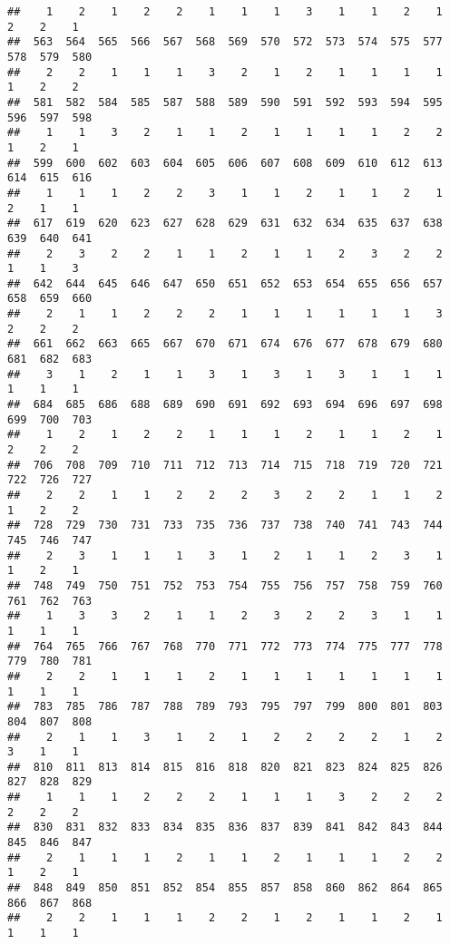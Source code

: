 \documentclass[
]{article}
\begin{document}
\begin{verbatim}
##    1    2    1    2    2    1    1    1    3    1    1    2    1    2    2    1 
##  563  564  565  566  567  568  569  570  572  573  574  575  577  578  579  580 
##    2    2    1    1    1    3    2    1    2    1    1    1    1    1    2    2 
##  581  582  584  585  587  588  589  590  591  592  593  594  595  596  597  598 
##    1    1    3    2    1    1    2    1    1    1    1    2    2    1    2    1 
##  599  600  602  603  604  605  606  607  608  609  610  612  613  614  615  616 
##    1    1    1    2    2    3    1    1    2    1    1    2    1    2    1    1 
##  617  619  620  623  627  628  629  631  632  634  635  637  638  639  640  641 
##    2    3    2    2    1    1    2    1    1    2    3    2    2    1    1    3 
##  642  644  645  646  647  650  651  652  653  654  655  656  657  658  659  660 
##    2    1    1    2    2    2    1    1    1    1    1    1    3    2    2    2 
##  661  662  663  665  667  670  671  674  676  677  678  679  680  681  682  683 
##    3    1    2    1    1    3    1    3    1    3    1    1    1    1    1    1 
##  684  685  686  688  689  690  691  692  693  694  696  697  698  699  700  703 
##    1    2    1    2    2    1    1    1    2    1    1    2    1    2    2    2 
##  706  708  709  710  711  712  713  714  715  718  719  720  721  722  726  727 
##    2    2    1    1    2    2    2    3    2    2    1    1    2    1    2    2 
##  728  729  730  731  733  735  736  737  738  740  741  743  744  745  746  747 
##    2    3    1    1    1    3    1    2    1    1    2    3    1    1    2    1 
##  748  749  750  751  752  753  754  755  756  757  758  759  760  761  762  763 
##    1    3    3    2    1    1    2    3    2    2    3    1    1    1    1    1 
##  764  765  766  767  768  770  771  772  773  774  775  777  778  779  780  781 
##    2    2    1    1    1    2    1    1    1    1    1    1    1    1    1    1 
##  783  785  786  787  788  789  793  795  797  799  800  801  803  804  807  808 
##    2    1    1    3    1    2    1    2    2    2    2    1    2    3    1    1 
##  810  811  813  814  815  816  818  820  821  823  824  825  826  827  828  829 
##    1    1    1    2    2    2    1    1    1    3    2    2    2    2    2    2 
##  830  831  832  833  834  835  836  837  839  841  842  843  844  845  846  847 
##    2    1    1    1    2    1    1    2    1    1    1    2    2    1    2    1 
##  848  849  850  851  852  854  855  857  858  860  862  864  865  866  867  868 
##    2    2    1    1    1    2    2    1    2    1    1    2    1    1    1    1 

\end{verbatim}
\end{document}
